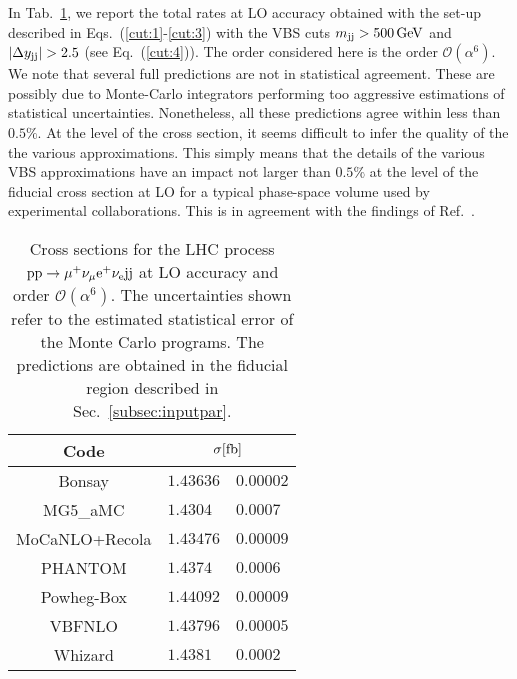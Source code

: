 In Tab.~\ref{tab:wg1_LOrates}, we report the total rates at LO accuracy obtained with the set-up described in Eqs.~(\ref{cut:1}-\ref{cut:3}) with the VBS cuts $m_{\text{j}\text{j}} > 500 \,\text{GeV}$ and $|\Delta y_{\text{j}\text{j}}| > 2.5$ (see Eq.~(\ref{cut:4})).
The order considered here is the order $\mathcal{O}(\alpha^6)$.
We note that several full predictions are not in statistical agreement. These are possibly due to Monte-Carlo 
integrators performing too aggressive estimations of statistical uncertainties. Nonetheless, all these predictions agree within less than $0.5\%$.
At the level of the cross section, it seems difficult to infer the quality of the the various approximations.
This simply means that the details of the various VBS approximations have an impact not larger than $0.5\%$ at 
the level of the fiducial cross section at LO for a typical phase-space volume used by experimental collaborations.
This is in agreement with the findings of Ref.~\cite{Denner:2012dz,Oleari:2003tc}.

\begin{table}[h!]
    \centering
    \begin{tabular}{c|r@{ $\pm$ }l}
      Code  &  \multicolumn{2}{c}{$\sigma[\rm{fb}]$}  \\
        \hline
        \hline
        {\sc Bonsay}  &  $1.43636$ & $0.00002$ \\
        {\sc MG5\_aMC}&  $1.4304\phantom{0}$ & $0.0007$ \\
        {\sc MoCaNLO+Recola}  &  $1.43476$ & $0.00009$ \\
        {\sc PHANTOM} &  $1.4374\phantom{0}$ & $0.0006 $  \\
        {\sc Powheg-Box}  &  $1.44092$ & $0.00009$ \\
        {\sc VBFNLO}  &  $1.43796$ & $0.00005$ \\
        {\sc Whizard} &  $1.4381\phantom{0}$ & $0.0002 $
    \end{tabular}
    \caption{\label{tab:wg1_LOrates} Cross sections for the LHC process ${\rm p}{\rm p}\to\mu^+\nu_\mu{\rm e}^+\nu_{\rm e}{\rm j}{\rm j}$ at LO accuracy and order $\mathcal{O}(\alpha^6)$.
    The uncertainties shown refer to the estimated statistical error of the Monte Carlo programs.
    The predictions are obtained in the fiducial region described in Sec.~\ref{subsec:inputpar}.}
\end{table}
